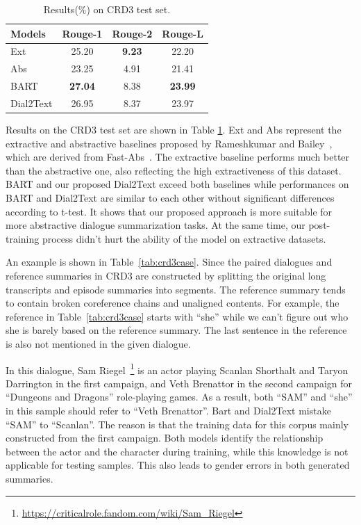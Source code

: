 \documentclass[letterpaper]{article} %
\begin{document}
\begin{table}[h]
	\centering
	\small
	\begin{tabular}{lccc}
		\toprule[1pt]
		\textbf{Models} & \textbf{Rouge-1} & \textbf{Rouge-2} & \textbf{Rouge-L} \\
		\midrule[1pt]
		{Ext} &25.20 &\textbf{9.23} &22.20 \\
		{Abs} & 23.25&4.91 &21.41\\
		{BART} & \textbf{27.04}&8.38 &\textbf{23.99} \\
		{Dial2Text} &26.95 &8.37 &23.97  \\
		\bottomrule[1pt]
	\end{tabular}
	\caption{Results(\%) on CRD3 test set.}
	\label{tab:crd3results}
\end{table}
Results on the CRD3 test set are shown in Table \ref{tab:crd3results}. Ext and Abs represent the extractive and abstractive baselines proposed by Rameshkumar and Bailey~, which are derived from Fast-Abs~\cite{chen2018fast}.
The extractive baseline performs much better than the abstractive one, also reflecting the high extractiveness of this dataset. 
BART and our proposed Dial2Text exceed both baselines while performances on BART and Dial2Text are similar to each other without significant differences according to t-test.
It shows that our proposed approach is more suitable for more abstractive dialogue summarization tasks. At the same time, our post-training process didn't hurt the ability of the model on extractive datasets. 


An example is shown in Table~\ref{tab:crd3case}.
Since the paired dialogues and reference summaries in CRD3 are constructed by splitting the original long transcripts and episode summaries into segments. The reference summary tends to contain broken coreference chains and unaligned contents. For example, the reference in Table~\ref{tab:crd3case} starts with ``she'' while we can't figure out who she is barely based on the reference summary. The last sentence in the reference is also not mentioned in the given dialogue. 

In this dialogue, Sam Riegel~\footnote{\url{https://criticalrole.fandom.com/wiki/Sam_Riegel}} is an actor playing Scanlan Shorthalt and Taryon Darrington in the first campaign, and Veth Brenattor in the second campaign for ``Dungeons and Dragons'' role-playing games. As a result, both ``SAM'' and ``she'' in this sample should refer to ``Veth Brenattor''. Bart and Dial2Text mistake ``SAM'' to ``Scanlan''. The reason is that the training data for this corpus mainly constructed from the first campaign. Both models identify the relationship between the actor and the character during training, while this knowledge is not applicable for testing samples. This also leads to gender errors in both generated summaries.
\end{document}
